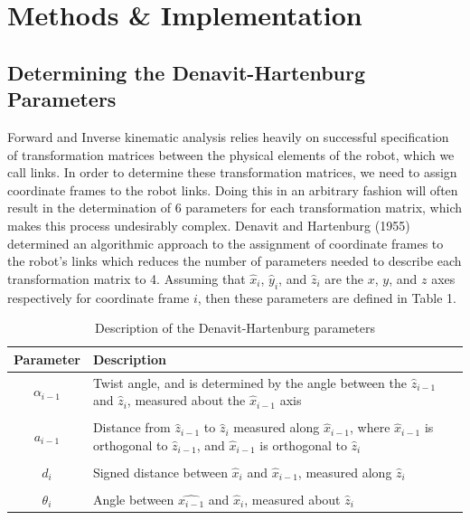 \documentclass[a4paper]{article}
\begin{document}
\section{Methods \& Implementation}

\subsection{Determining the Denavit-Hartenburg Parameters}
Forward and Inverse kinematic analysis relies heavily on successful specification of transformation matrices between the physical elements of the robot, which we call links. In order to determine these transformation matrices, we need to assign coordinate frames to the robot links. Doing this in an arbitrary fashion will often result in the determination of 6 parameters for each transformation matrix, which makes this process undesirably complex. Denavit and Hartenburg (1955) determined an algorithmic approach to the assignment of coordinate frames to the robot's links which reduces the number of parameters needed to describe each transformation matrix to 4. Assuming that $\hat{x}_i$, $\hat{y}_i$, and $\hat{z}_i$ are the $x$, $y$, and $z$ axes respectively for coordinate frame $i$, then these parameters are defined in Table 1.

\begin{table}[h]
\centering
\caption{Description of the Denavit-Hartenburg parameters}
\begin{tabular}{cp{8cm}}
\toprule
\textbf{Parameter} & \textbf{Description}\\
\midrule
$\alpha_{i-1}$ & Twist angle, and is determined by the angle between the $\hat{z}_{i-1}$ and $\hat{z}_i$, measured about the $\hat{x}_{i-1}$ axis\\
 & \\
$a_{i-1}$ & Distance from $\hat{z}_{i-1}$ to $\hat{z}_i$ measured along $\hat{x}_{i-1}$, where $\hat{x}_{i-1}$ is orthogonal to $\hat{z}_{i-1}$, and $\hat{x}_{i-1}$ is orthogonal to $\hat{z}_i$\\
 & \\
$d_i$ & Signed distance between $\hat{x}_i$ and $\hat{x}_{i-1}$, measured along $\hat{z}_i$\\
 & \\
$\theta_i$ & Angle between $\hat{x_{i-1}}$ and $\hat{x}_i$, measured about $\hat{z}_i$\\
\bottomrule
\end{tabular}
\end{table}
\end{document}

